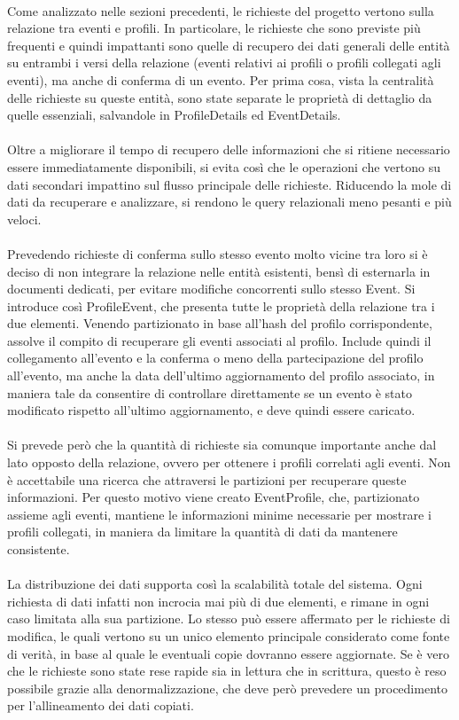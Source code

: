 \\
Come analizzato nelle sezioni precedenti,
le richieste del progetto vertono sulla relazione tra eventi e profili.
In particolare, le richieste che sono previste più frequenti e quindi impattanti
sono quelle di recupero dei dati generali delle entità su entrambi i versi della relazione
(eventi relativi ai profili o profili collegati agli eventi),
ma anche di conferma di un evento.
Per prima cosa, vista la centralità delle richieste su queste entità,
sono state separate le proprietà di dettaglio da quelle essenziali,
salvandole in ProfileDetails ed EventDetails.\\
\\
Oltre a migliorare il tempo di recupero delle informazioni
che si ritiene necessario essere immediatamente disponibili, 
si evita così che le operazioni che vertono su dati secondari 
impattino sul flusso principale delle richieste.
Riducendo la mole di dati da recuperare e analizzare,
si rendono le query relazionali meno pesanti e più veloci.\\
\\
Prevedendo richieste di conferma sullo stesso evento molto vicine tra loro
si è deciso di non integrare la relazione nelle entità esistenti,
bensì di esternarla in documenti dedicati,
per evitare modifiche concorrenti sullo stesso Event.
Si introduce così ProfileEvent,
che presenta tutte le proprietà della relazione tra i due elementi.
Venendo partizionato in base all'hash del profilo corrispondente,
assolve il compito di recuperare gli eventi associati al profilo.
Include quindi il collegamento all'evento e
la conferma o meno della partecipazione del profilo all'evento,
ma anche la data dell'ultimo aggiornamento del profilo associato,
in maniera tale da consentire di controllare direttamente
se un evento è stato modificato rispetto all'ultimo aggiornamento,
e deve quindi essere caricato.\\
\\
Si prevede però che la quantità di richieste sia comunque importante
anche dal lato opposto della relazione,
ovvero per ottenere i profili correlati agli eventi.
Non è accettabile una ricerca che attraversi le partizioni per recuperare queste informazioni.
Per questo motivo viene creato EventProfile,
che, partizionato assieme agli eventi,
mantiene le informazioni minime necessarie per mostrare i profili collegati,
in maniera da limitare la quantità di dati da mantenere consistente.\\
\\
La distribuzione dei dati supporta così la scalabilità totale del sistema.
Ogni richiesta di dati infatti non incrocia mai più di due elementi,
e rimane in ogni caso limitata alla sua partizione.
Lo stesso può essere affermato per le richieste di modifica, 
le quali vertono su un unico elemento principale considerato come fonte di verità,
in base al quale le eventuali copie dovranno essere aggiornate.
Se è vero che le richieste sono state rese rapide 
sia in lettura che in scrittura,
questo è reso possibile grazie alla denormalizzazione, 
che deve però prevedere un procedimento per l'allineamento
dei dati copiati.\\

